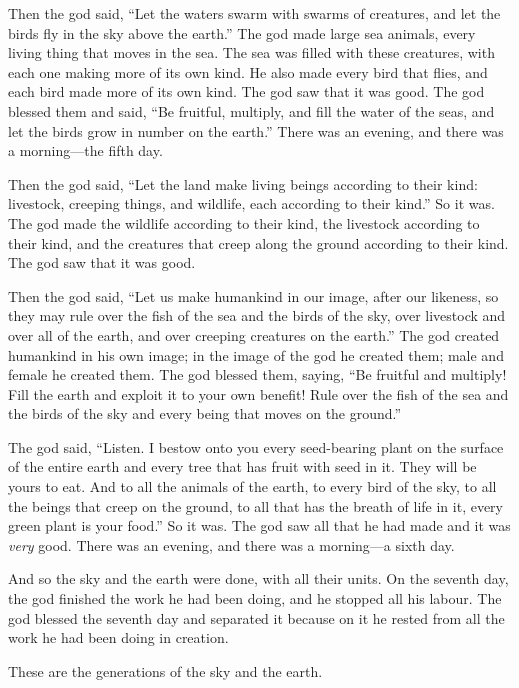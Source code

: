 Then the god said, 
\enquote{Let the waters swarm with swarms of creatures, 
and let the birds fly in the sky above the earth.} 
The god made large sea animals, every living thing that moves in the sea. 
The sea was filled with these creatures, 
with each one making more of its own kind. 
He also made every bird that flies, 
and each bird made more of its own kind. 
The god saw that it was good. 
The god blessed them and said, 
\enquote{Be fruitful, multiply, and fill the water of the seas, 
and let the birds grow in number on the earth.} 
There was an evening, and there was a morning---the fifth day.

Then the god said, 
\enquote{Let the land make living beings according to their kind: 
livestock, creeping things, and wildlife, each according to their kind.}
So it was. 
The god made the wildlife according to their kind, 
the livestock according to their kind, 
and the creatures that creep along the ground according to their kind. 
The god saw that it was good. 

Then the god said, 
\enquote{Let us make humankind in our image, after our likeness, 
so they may rule over the fish of the sea and the birds of the sky, 
over livestock and over all of the earth, 
and over creeping creatures on the earth.} 
The god created humankind in his own image; 
in the image of the god he created them;
male and female he created them. 
The god blessed them, saying, 
\enquote{Be fruitful and multiply! 
Fill the earth and exploit it to your own benefit! 
Rule over the fish of the sea and the birds of the sky 
and every being that moves on the ground.} 

The god said, 
\enquote{Listen. 
I bestow onto you every seed-bearing plant on the surface of the entire earth 
and every tree that has fruit with seed in it. 
They will be yours to eat. 
And to all the animals of the earth, 
to every bird of the sky, 
to all the beings that creep on the ground, 
to all that has the breath of life in it, 
every green plant is your food.} 
So it was. 
The god saw all that he had made and it was \textit{very} good. 
There was an evening, and there was a morning---a sixth day.

And so the sky and the earth were done, with all their units. 
On the seventh day, the god finished the work he had been doing, 
and he stopped all his labour. 
The god blessed the seventh day and separated it 
because on it he rested from all the work he had been doing in creation.

These are the generations of the sky and the earth. 
